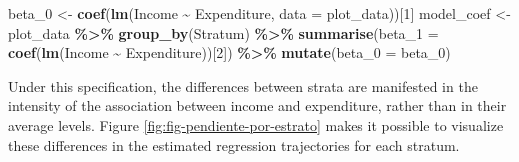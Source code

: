\documentclass[
  english,
  12pt,
]{book}
\newenvironment{Shaded}{\begin{snugshade}}{\end{snugshade}}
\newcommand{\AttributeTok}[1]{\textcolor[rgb]{0.13,0.29,0.53}{#1}}
\newcommand{\DecValTok}[1]{\textcolor[rgb]{0.00,0.00,0.81}{#1}}
\newcommand{\FloatTok}[1]{\textcolor[rgb]{0.00,0.00,0.81}{#1}}
\newcommand{\FunctionTok}[1]{\textcolor[rgb]{0.13,0.29,0.53}{\textbf{#1}}}
\newcommand{\NormalTok}[1]{#1}
\newcommand{\OtherTok}[1]{\textcolor[rgb]{0.56,0.35,0.01}{#1}}
\newcommand{\SpecialCharTok}[1]{\textcolor[rgb]{0.81,0.36,0.00}{\textbf{#1}}}
\newcommand{\StringTok}[1]{\textcolor[rgb]{0.31,0.60,0.02}{#1}}
\begin{document}
\begin{Shaded}
\begin{Highlighting}[]
\NormalTok{beta\_0 }\OtherTok{\textless{}{-}} \FunctionTok{coef}\NormalTok{(}\FunctionTok{lm}\NormalTok{(Income }\SpecialCharTok{\textasciitilde{}}\NormalTok{ Expenditure, }\AttributeTok{data =}\NormalTok{ plot\_data))[}\DecValTok{1}\NormalTok{]}
\NormalTok{model\_coef }\OtherTok{\textless{}{-}}\NormalTok{ plot\_data }\SpecialCharTok{\%\textgreater{}\%}
  \FunctionTok{group\_by}\NormalTok{(Stratum) }\SpecialCharTok{\%\textgreater{}\%}
  \FunctionTok{summarise}\NormalTok{(}\AttributeTok{beta\_1 =} \FunctionTok{coef}\NormalTok{(}\FunctionTok{lm}\NormalTok{(Income }\SpecialCharTok{\textasciitilde{}}\NormalTok{ Expenditure))[}\DecValTok{2}\NormalTok{]) }\SpecialCharTok{\%\textgreater{}\%}
  \FunctionTok{mutate}\NormalTok{(}\AttributeTok{beta\_0 =}\NormalTok{ beta\_0)}
\end{Highlighting}
\end{Shaded}

Under this specification, the differences between strata are manifested in the intensity of the association between income and expenditure, rather than in their average levels. Figure \ref{fig:fig-pendiente-por-estrato} makes it possible to visualize these differences in the estimated regression trajectories for each stratum.

\begin{Shaded}
\end{Shaded}
\end{document}
